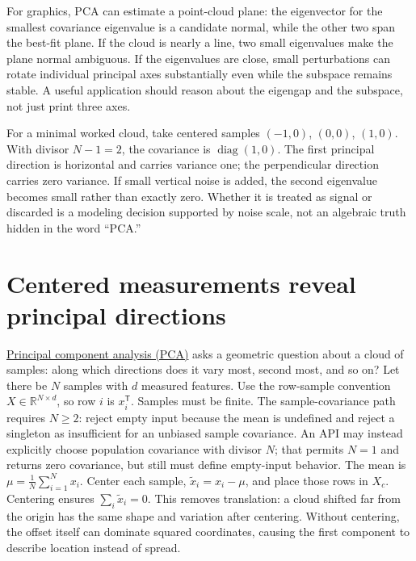 For graphics, PCA can estimate a point-cloud plane: the eigenvector for the smallest covariance eigenvalue is a candidate normal, while the other two span the best-fit plane. If the cloud is nearly a line, two small eigenvalues make the plane normal ambiguous. If the eigenvalues are close, small perturbations can rotate individual principal axes substantially even while the subspace remains stable. A useful application should reason about the eigengap and the subspace, not just print three axes.

For a minimal worked cloud, take centered samples \((-1,0)\), \((0,0)\), \((1,0)\). With divisor \(N-1=2\), the covariance is \(\operatorname{diag}(1,0)\). The first principal direction is horizontal and carries variance one; the perpendicular direction carries zero variance. If small vertical noise is added, the second eigenvalue becomes small rather than exactly zero. Whether it is treated as signal or discarded is a modeling decision supported by noise scale, not an algebraic truth hidden in the word ``PCA.''

\section{Centered measurements reveal principal directions}\label{02-foundations-ii-ch024-centered-measurements-reveal-principal-directions}

\hyperref[02-foundations-ii-ch024-centered-measurements-reveal-principal-directions]{Principal component analysis (PCA)} asks a geometric question about a cloud of samples: along which directions does it vary most, second most, and so on? Let there be \(N\) samples with \(d\) measured features. Use the row-sample convention \(X\in\mathbb R^{N\times d}\), so row \(i\) is \(x_i^\mathsf T\). Samples must be finite. The sample-covariance path requires \(N\ge2\): reject empty input because the mean is undefined and reject a singleton as insufficient for an unbiased sample covariance. An API may instead explicitly choose population covariance with divisor \(N\); that permits \(N=1\) and returns zero covariance, but still must define empty-input behavior. The mean is \(\mu=\frac1N\sum_{i=1}^N x_i\). Center each sample, \(\tilde x_i=x_i-\mu\), and place those rows in \(X_c\). Centering ensures \(\sum_i\tilde x_i=0\). This removes translation: a cloud shifted far from the origin has the same shape and variation after centering. Without centering, the offset itself can dominate squared coordinates, causing the first component to describe location instead of spread.

